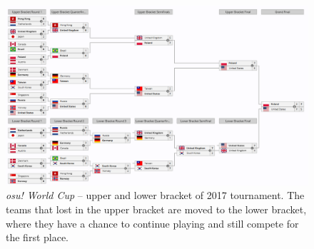 \begin{figure}[h]
    \centering\includegraphics[scale=0.15]{obrazki/osuworldcup.png}
    \caption{\textit{osu! World Cup} -- upper and lower bracket of 2017 tournament. The teams that lost in the upper bracket are moved to the lower bracket, where they have a chance to continue playing and still compete for the first place. \cite{2017osu}}
    \label{fig:osuworldcup}
\end{figure}

